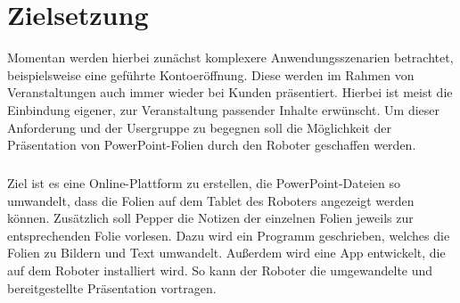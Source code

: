 \section{Zielsetzung}\label{sec:zielsetzung}
Momentan werden hierbei zunächst komplexere Anwendungsszenarien betrachtet,
beispielsweise eine geführte Kontoeröffnung. Diese werden im Rahmen von
Veranstaltungen auch immer wieder bei Kunden präsentiert. Hierbei ist meist die
Einbindung eigener, zur Veranstaltung passender Inhalte erwünscht. Um dieser
Anforderung und der Usergruppe zu begegnen soll die Möglichkeit der
Präsentation von PowerPoint-Folien durch den Roboter geschaffen werden.

\subparagraph{}
Ziel ist es eine Online-Plattform zu erstellen, die PowerPoint-Dateien so
umwandelt, dass die Folien auf dem Tablet des Roboters angezeigt werden können.
Zusätzlich soll Pepper die Notizen der einzelnen Folien jeweils zur
entsprechenden Folie vorlesen. Dazu wird ein Programm geschrieben, welches die
Folien zu Bildern und Text umwandelt. Außerdem wird eine App entwickelt, die auf
dem Roboter installiert wird. So kann der Roboter die umgewandelte und
bereitgestellte Präsentation vortragen.
